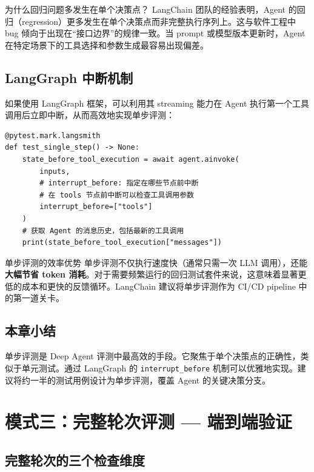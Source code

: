 \documentclass[a4paper]{article}
\begin{document}
\begin{knowledgebox}{为什么回归问题多发生在单个决策点？}
LangChain 团队的经验表明，Agent 的回归（regression）更多发生在单个决策点而非完整执行序列上。这与软件工程中 bug 倾向于出现在``接口边界''的规律一致。当 prompt 或模型版本更新时，Agent 在特定场景下的工具选择和参数生成最容易出现偏差。
\end{knowledgebox}

\subsection{LangGraph 中断机制}

如果使用 LangGraph 框架，可以利用其 streaming 能力在 Agent 执行第一个工具调用后立即中断，从而高效地实现单步评测：

\begin{lstlisting}[caption={LangGraph 单步评测 --- interrupt\_before 机制}, label={lst:single-step}]
@pytest.mark.langsmith
def test_single_step() -> None:
    state_before_tool_execution = await agent.ainvoke(
        inputs,
        # interrupt_before: 指定在哪些节点前中断
        # 在 tools 节点前中断可以检查工具调用参数
        interrupt_before=["tools"]
    )
    # 获取 Agent 的消息历史，包括最新的工具调用
    print(state_before_tool_execution["messages"])
\end{lstlisting}

\begin{importantbox}{单步评测的效率优势}
单步评测不仅执行速度快（通常只需一次 LLM 调用），还能\textbf{大幅节省 token 消耗}。对于需要频繁运行的回归测试套件来说，这意味着显著更低的成本和更快的反馈循环。LangChain 建议将单步评测作为 CI/CD pipeline 中的第一道关卡。
\end{importantbox}

\subsection{本章小结}

单步评测是 Deep Agent 评测中最高效的手段。它聚焦于单个决策点的正确性，类似于单元测试。通过 LangGraph 的 \texttt{interrupt\_before} 机制可以优雅地实现。建议将约一半的测试用例设计为单步评测，覆盖 Agent 的关键决策分支。


\section{模式三：完整轮次评测 --- 端到端验证}

\subsection{完整轮次的三个检查维度}
\end{document}
